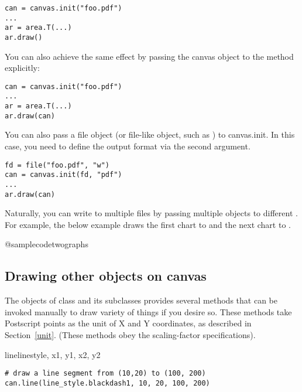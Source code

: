 \documentclass{howto}
\newcommand{\secref}[1]{Section~\ref{#1}}
\begin{document}
\begin{verbatim}
can = canvas.init("foo.pdf")
...
ar = area.T(...)
ar.draw()
\end{verbatim}

You can also achieve the same effect by passing the canvas object to the
 method explicitly:

\begin{verbatim}
can = canvas.init("foo.pdf")
...
ar = area.T(...)
ar.draw(can)
\end{verbatim}

You can also pass a file object (or file-like object, such as
) to canvas.init. In this case, you need
to define the output format via the second argument.

\begin{verbatim}
fd = file("foo.pdf", "w")
can = canvas.init(fd, "pdf")
...
ar.draw(can)
\end{verbatim}


Naturally, you can write to multiple files by passing multiple
 objects to different .  For example,
the below example draws the first chart to  and the next
chart to .

@samplecode{twographs}

\subsection{Drawing other objects on canvas}\label{drawing-canvas}

The objects of  class and its subclasses provides
several methods that can be invoked manually to draw variety of things
if you desire so. These methods take Postscript points
as the unit of X and Y
coordinates, as described in \secref{unit}.
(These methods obey the scaling-factor specifications).

\begin{methoddesc}{line}{linestyle, x1, y1, x2, y2}

\begin{verbatim}
# draw a line segment from (10,20) to (100, 200)
can.line(line_style.blackdash1, 10, 20, 100, 200)
\end{verbatim}
\end{methoddesc}
\end{document}
